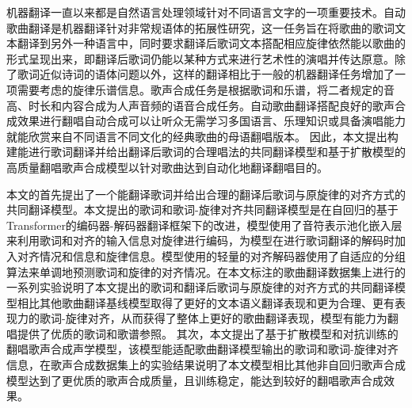 \newcommand{\eg}{\textit{e}.\textit{g}.}
机器翻译一直以来都是自然语言处理领域针对不同语言文字的一项重要技术。自动歌曲翻译是机器翻译针对非常规语体的拓展性研究，这一任务旨在将歌曲的歌词文本翻译到另外一种语言中，同时要求翻译后歌词文本搭配相应旋律依然能以歌曲的形式呈现出来，即翻译后歌词仍能以某种方式来进行艺术性的演唱并传达原意。除了歌词近似诗词的语体问题以外，这样的翻译相比于一般的机器翻译任务增加了一项需要考虑的旋律乐谱信息。歌声合成任务是根据歌词和乐谱，将二者规定的音高、时长和内容合成为人声音频的语音合成任务。自动歌曲翻译搭配良好的歌声合成效果进行翻唱自动合成可以让听众无需学习多国语言、乐理知识或具备演唱能力就能欣赏来自不同语言不同文化的经典歌曲的母语翻唱版本。
因此，本文提出构建能进行歌词翻译并给出翻译后歌词的合理唱法的共同翻译模型和基于扩散模型的高质量翻唱歌声合成模型以针对歌曲达到自动化地翻译翻唱目的。

本文的首先提出了一个能翻译歌词并给出合理的翻译后歌词与原旋律的对齐方式的共同翻译模型。本文提出的歌词和歌词-旋律对齐共同翻译模型是在自回归的基于Transformer的编码器-解码器翻译框架下的改进，模型使用了音符表示池化嵌入层来利用歌词和对齐的输入信息对旋律进行编码，为模型在进行歌词翻译的解码时加入对齐情况和信息和旋律信息。模型使用的轻量的对齐解码器使用了自适应的分组算法来单调地预测歌词和旋律的对齐情况。在本文标注的歌曲翻译数据集上进行的一系列实验说明了本文提出的歌词和翻译后歌词与原旋律的对齐方式的共同翻译模型相比其他歌曲翻译基线模型取得了更好的文本语义翻译表现和更为合理、更有表现力的歌词-旋律对齐，从而获得了整体上更好的歌曲翻译表现，模型有能力为翻唱提供了优质的歌词和歌谱参照。
其次，本文提出了基于扩散模型和对抗训练的翻唱歌声合成声学模型，该模型能适配歌曲翻译模型输出的歌词和歌词-旋律对齐信息，在歌声合成数据集上的实验结果说明了本文模型相比其他非自回归歌声合成模型达到了更优质的歌声合成质量，且训练稳定，能达到较好的翻唱歌声合成效果。

